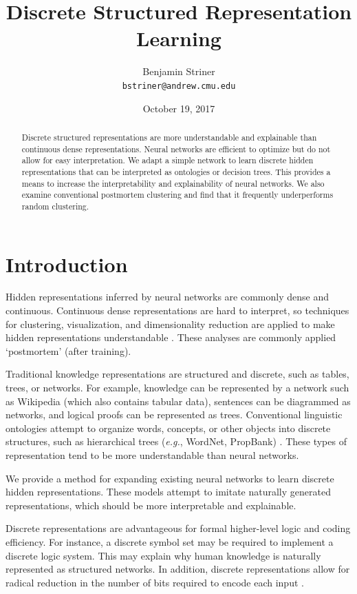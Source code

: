 \documentclass[11pt,letterpaper]{article}
\title{Discrete Structured Representation Learning}
\author{Benjamin Striner \\
  {\tt bstriner@andrew.cmu.edu} \\}
\date{October 19, 2017}
\begin{document}
\maketitle
\begin{abstract}
Discrete structured representations are more understandable and explainable than continuous dense representations. Neural networks are efficient to optimize but do not allow for easy interpretation. We adapt a simple network to learn discrete hidden representations that can be interpreted as ontologies or decision trees. This provides a means to increase the interpretability and explainability of neural networks. We also examine conventional postmortem clustering and find that it frequently underperforms random clustering.
\end{abstract}

\section{Introduction}

Hidden representations inferred by neural networks are commonly dense and continuous. Continuous dense representations are hard to interpret, so techniques for clustering, visualization, and dimensionality reduction are applied to make hidden representations understandable \cite{Montavon}. These analyses are commonly applied `postmortem' (after training).

Traditional knowledge representations are structured and discrete, such as tables, trees, or networks. For example, knowledge can be represented by a network such as Wikipedia (which also contains tabular data), sentences can be diagrammed as networks, and logical proofs can be represented as trees. Conventional linguistic ontologies attempt to organize words, concepts, or other objects into discrete structures, such as hierarchical trees (\textit{e.g.}, WordNet, PropBank) \cite{Miller:1995:WLD:219717.219748}. These types of representation tend to be more understandable than neural networks.

We provide a method for expanding existing neural networks to learn discrete hidden representations. These models attempt to imitate naturally generated representations, which should be more interpretable and explainable.

Discrete representations are advantageous for formal higher-level logic and coding efficiency. For instance, a discrete symbol set may be required to implement a discrete logic system. This may explain why human knowledge is naturally represented as structured networks. In addition, discrete representations allow for radical reduction in the number of bits required to encode each input \cite{Hu17}.
\end{document}
